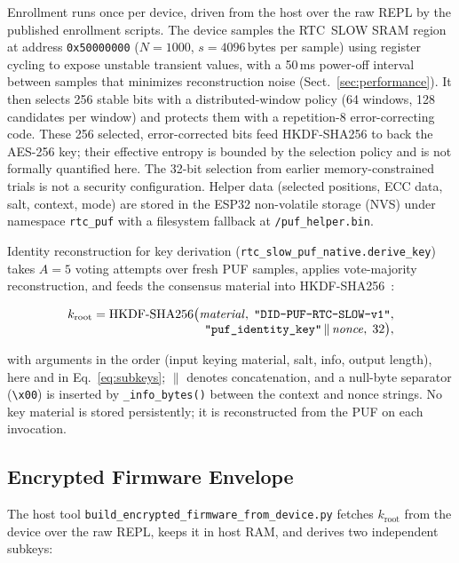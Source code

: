 \documentclass[runningheads]{llncs}
\begin{document}
Enrollment runs once per device, driven from the host over the raw REPL by the published enrollment scripts. The device samples the RTC~SLOW SRAM region at address \texttt{0x50000000} ($N=1000$, $s=4096$\,bytes per sample) using register cycling to expose unstable transient values, with a 50\,ms power-off interval between samples that minimizes reconstruction noise (Sect.~\ref{sec:performance}). It then selects 256 stable bits with a distributed-window policy (64 windows, 128 candidates per window) and protects them with a repetition-8 error-correcting code. These 256 selected, error-corrected bits feed HKDF-SHA256 to back the AES-256 key; their effective entropy is bounded by the selection policy and is not formally quantified here. The 32-bit selection from earlier memory-constrained trials is not a security configuration. Helper data (selected positions, ECC data, salt, context, mode) are stored in the ESP32 non-volatile storage (NVS) under namespace \texttt{rtc\_puf} with a filesystem fallback at \texttt{/puf\_helper.bin}.

Identity reconstruction for key derivation (\texttt{rtc\_slow\_puf\_native.derive\_key}) takes $A=5$ voting attempts over fresh PUF samples, applies vote-majority reconstruction, and feeds the consensus material into HKDF-SHA256~\cite{krawczyk2010hkdf}:

\begin{equation}
\begin{array}{l}
k_{\mathrm{root}} = \mathrm{HKDF}\mbox{-}\mathrm{SHA256}\bigl(
  \mathit{material},\;
  \mbox{\texttt{"DID-PUF-RTC-SLOW-v1"}},\\
\hfill
  \mbox{\texttt{"puf\_identity\_key"}} \,\|\, \mathit{nonce},\;
  32\bigr),
\end{array}
\label{eq:kdf}
\end{equation}

\noindent with arguments in the order (input keying material, salt, info, output length), here and in Eq.~\ref{eq:subkeys}; $\|$ denotes concatenation, and a null-byte separator (\texttt{\textbackslash x00}) is inserted by \texttt{\_info\_bytes()} between the context and nonce strings. No key material is stored persistently; it is reconstructed from the PUF on each invocation.

\subsection{Encrypted Firmware Envelope}

The host tool \texttt{build\_encrypted\_firmware\_from\_device.py} fetches $k_{\mathrm{root}}$ from the device over the raw REPL, keeps it in host RAM, and derives two independent subkeys:
\end{document}
